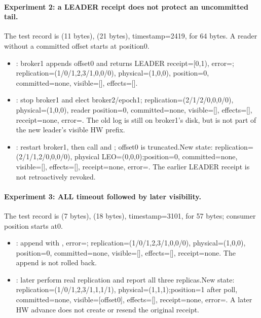 \paragraph{Experiment 2: a LEADER receipt does not protect an uncommitted tail.}The test record is  (11 bytes),  (21 bytes), timestamp=2419, for 64 bytes. A reader without a committed offset starts at position0.
\begin{itemize}
\item {}: broker1 appends offset0 and returns LEADER receipt=[0,1), error=; replication=(1/0/{1,2,3}/{1,0,0}/0), physical=(1,0,0), position=0, committed=none, visible=[], effects=[].
\item {}: stop broker1 and elect broker2/epoch1; replication=(2/1/{2}/{0,0,0}/0), physical=(1,0,0), reader position=0, committed=none, visible=[], effects=[], receipt=none, error=. The old log is still on broker1's disk, but is not part of the new leader's visible HW prefix.
\item {}: restart broker1, then call  and ; offset0 is truncated.\newline New state: replication=(2/1/{1,2}/{0,0,0}/0), physical LEO=(0,0,0);\newline position=0, committed=none, visible=[], effects=[], receipt=none, error=. The earlier LEADER receipt is not retroactively revoked.
\end{itemize}
\paragraph{Experiment 3: ALL timeout followed by later visibility.}The test record is  (7 bytes),  (18 bytes), timestamp=3101, for 57 bytes; consumer position starts at0.
\begin{itemize}
\item {}: append with , error=; replication=(1/0/{1,2,3}/{1,0,0}/0), physical=(1,0,0), position=0, committed=none, visible=[], effects=[], receipt=none. The append is not rolled back.
\item {}: later perform real replication and report all three replicas.\newline New state: replication=(1/0/{1,2,3}/{1,1,1}/1), physical=(1,1,1);\newline position=1 after poll, committed=none, visible=[offset0], effects=[], receipt=none, error=. A later HW advance does not create or resend the original receipt.
\end{itemize}
